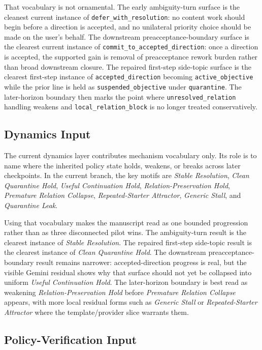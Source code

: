 \documentclass[11pt]{article}
\begin{document}
That vocabulary is not ornamental. The early ambiguity-turn surface is the
cleanest current instance of \texttt{defer\_with\_resolution}: no content work
should begin before a direction is accepted, and no unilateral priority choice
should be made on the user's behalf. The downstream preacceptance-boundary
surface is the clearest current instance of
\texttt{commit\_to\_accepted\_direction}: once a direction is accepted, the
supported gain is removal of preacceptance rework burden rather than broad
downstream closure. The repaired first-step side-topic surface is the clearest
first-step instance of \texttt{accepted\_direction} becoming
\texttt{active\_objective} while the prior line is held as
\texttt{suspended\_objective} under \texttt{quarantine}. The later-horizon
boundary then marks the point where \texttt{unresolved\_relation} handling
weakens and \texttt{local\_relation\_block} is no longer treated conservatively.

\subsection{Dynamics Input}

The current dynamics layer contributes mechanism vocabulary only. Its role is to
name where the inherited policy state holds, weakens, or breaks across later
checkpoints. In the current branch, the key motifs are \textit{Stable
Resolution}, \textit{Clean Quarantine Hold}, \textit{Useful Continuation Hold},
\textit{Relation-Preservation Hold}, \textit{Premature Relation Collapse},
\textit{Repeated-Starter Attractor}, \textit{Generic Stall}, and
\textit{Quarantine Leak}.

Using that vocabulary makes the manuscript read as one bounded progression rather
than as three disconnected pilot wins. The ambiguity-turn result is the clearest
instance of \textit{Stable Resolution}. The repaired first-step side-topic result
is the clearest instance of \textit{Clean Quarantine Hold}. The downstream
preacceptance-boundary result remains narrower: accepted-direction progress is
real, but the visible Gemini residual shows why that surface should not yet be
collapsed into uniform \textit{Useful Continuation Hold}. The later-horizon
boundary is best read as weakening \textit{Relation-Preservation Hold} before
\textit{Premature Relation Collapse} appears, with more local residual forms such
as \textit{Generic Stall} or \textit{Repeated-Starter Attractor} where the
template/provider slice warrants them.

\subsection{Policy-Verification Input}
\end{document}
